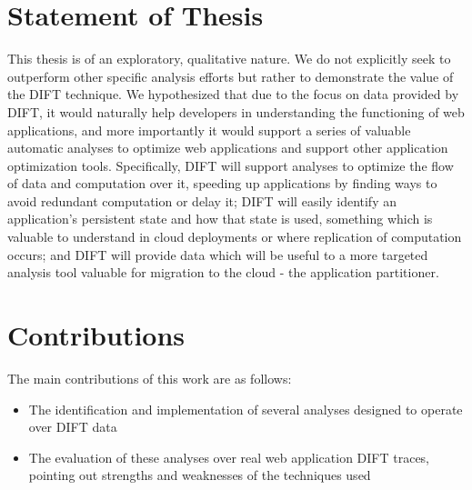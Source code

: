 \documentclass[msc,oneside]{ubcthesis}
\begin{document}
\section{Statement of Thesis}
	
This thesis is of an exploratory, qualitative nature. We do not explicitly seek to outperform other specific analysis efforts but rather to demonstrate the value of the DIFT technique. We hypothesized that due to the focus on data provided by DIFT, it would naturally help developers in understanding the functioning of web applications, and more importantly it would support a series of valuable automatic analyses to optimize web applications and support other application optimization tools. Specifically, DIFT will support analyses to optimize the flow of data and computation over it, speeding up applications by finding ways to avoid redundant computation or delay it; DIFT will easily identify an application's persistent state and how that state is used, something which is valuable to understand in cloud deployments or where replication of computation occurs; and DIFT will provide data which will be useful to a more targeted analysis tool valuable for migration to the cloud - the application partitioner.
	
	

\section{Contributions}
	
The main contributions of this work are as follows: 
\begin{itemize}
\item The identification and implementation of several analyses designed to operate over DIFT data
\item The evaluation of these analyses over real web application DIFT traces, pointing out strengths and weaknesses of the techniques used
\end{itemize}
\end{document}

